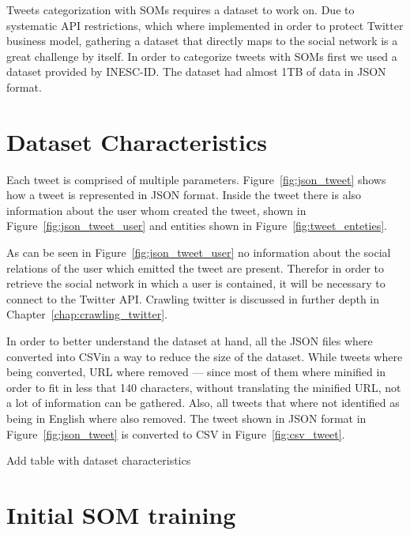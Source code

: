 \label{ch:clustering_tweets}

Tweets categorization with \ac{SOMs} requires a dataset to work on. Due to systematic API restrictions, which where implemented in order to protect Twitter business model, gathering a dataset that directly maps to the social network is a great challenge by itself. 
In order to categorize tweets with \ac{SOMs} first we used a dataset provided by INESC-ID. The dataset had almost 1TB of data in \ac{JSON} format.

\section{Dataset Characteristics}
\label{sec:dataset_characteristics}

Each tweet is comprised of multiple parameters. Figure~\ref{fig:json_tweet} shows how a tweet is represented in \ac{JSON} format. Inside the tweet there is also information about the user whom created the tweet, shown in Figure~\ref{fig:json_tweet_user} and entities shown in Figure~\ref{fig:tweet_enteties}.

As can be seen in Figure~\ref{fig:json_tweet_user} no information about the social relations of the user which emitted the tweet are present. Therefor in order to retrieve the social network in which a user is contained, it will be necessary to connect to the Twitter API. Crawling twitter is discussed in further depth in Chapter~\ref{chap:crawling_twitter}.  


%
%

In order to better understand the dataset at hand, all the \ac{JSON} files where converted into \ac{CSV}in a way to reduce the size of the dataset. While tweets where being converted, \ac{URL} where removed --- since most of them where minified in order to fit in less that 140 characters, without translating the minified URL, not a lot of information can be gathered. Also, all tweets that where not identified as being in English where also removed. The tweet shown in \ac{JSON} format in Figure~\ref{fig:json_tweet} is converted to \ac{CSV} in Figure~\ref{fig:csv_tweet}.


{\color{red} Add table with dataset characteristics }


\section{Initial SOM training}
\label{sec:ininitial_som_trainning}


